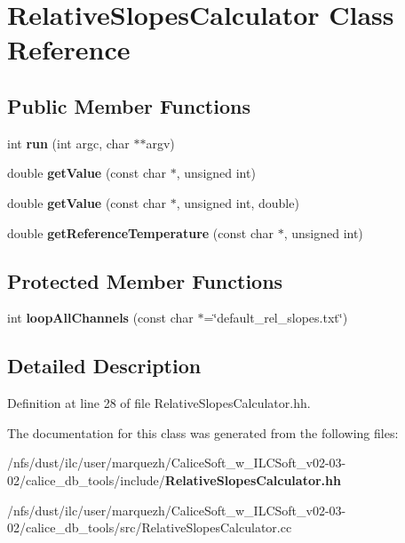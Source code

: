 \section{Relative\-Slopes\-Calculator Class Reference}
\label{classRelativeSlopesCalculator}
\subsection*{Public Member Functions}
\begin{DoxyCompactItemize}
\item 
int {\bfseries run} (int argc, char $\ast$$\ast$argv)\label{classRelativeSlopesCalculator_afe80265289b375bdf3473268421ef6f8}

\item 
double {\bfseries get\-Value} (const char $\ast$, unsigned int)\label{classRelativeSlopesCalculator_a37ec713046ab2a219da5202614a74c04}

\item 
double {\bfseries get\-Value} (const char $\ast$, unsigned int, double)\label{classRelativeSlopesCalculator_ae55520b72d509a5aa668aa666942a582}

\item 
double {\bfseries get\-Reference\-Temperature} (const char $\ast$, unsigned int)\label{classRelativeSlopesCalculator_a952b021211863b57ff58db16c599e51a}

\end{DoxyCompactItemize}
\subsection*{Protected Member Functions}
\begin{DoxyCompactItemize}
\item 
int {\bfseries loop\-All\-Channels} (const char $\ast$=\char`\"{}default\-\_\-rel\-\_\-slopes.\-txt\char`\"{})\label{classRelativeSlopesCalculator_ab332e02dc1327d6b825c8a316a1aca5d}

\end{DoxyCompactItemize}


\subsection{Detailed Description}


Definition at line 28 of file Relative\-Slopes\-Calculator.\-hh.



The documentation for this class was generated from the following files\-:\begin{DoxyCompactItemize}
\item 
/nfs/dust/ilc/user/marquezh/\-Calice\-Soft\-\_\-w\-\_\-\-I\-L\-C\-Soft\-\_\-v02-\/03-\/02/calice\-\_\-db\-\_\-tools/include/{\bf Relative\-Slopes\-Calculator.\-hh}\item 
/nfs/dust/ilc/user/marquezh/\-Calice\-Soft\-\_\-w\-\_\-\-I\-L\-C\-Soft\-\_\-v02-\/03-\/02/calice\-\_\-db\-\_\-tools/src/Relative\-Slopes\-Calculator.\-cc\end{DoxyCompactItemize}
